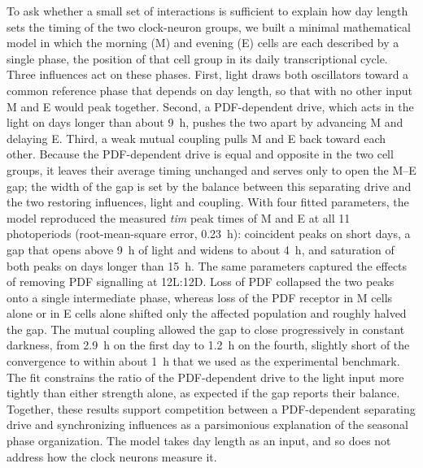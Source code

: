 To ask whether a small set of interactions is sufficient to explain how
day length sets the timing of the two clock-neuron groups, we built a
minimal mathematical model in which the morning (M) and evening (E) cells
are each described by a single phase, the position of that cell group in
its daily transcriptional cycle. Three influences act on these phases.
First, light draws both oscillators toward a common reference phase that
depends on day length, so that with no other input M and E would peak
together. Second, a PDF-dependent drive, which acts in the light on days
longer than about 9~h, pushes the two apart by advancing M and delaying E.
Third, a weak mutual coupling pulls M and E back toward each other.
Because the PDF-dependent drive is equal and opposite in the two cell
groups, it leaves their average timing unchanged and serves only to open
the M--E gap; the width of the gap is set by the balance between this
separating drive and the two restoring influences, light and coupling.
With four fitted parameters, the model reproduced the measured
\textit{tim} peak times of M and E at all 11 photoperiods
(root-mean-square error, 0.23~h): coincident peaks on short days, a gap
that opens above 9~h of light and widens to about 4~h, and saturation of
both peaks on days longer than 15~h. The same parameters captured the
effects of removing PDF signalling at 12L:12D. Loss of PDF collapsed the
two peaks onto a single intermediate phase, whereas loss of the PDF
receptor in M cells alone or in E cells alone shifted only the affected
population and roughly halved the gap. The mutual coupling allowed the gap
to close progressively in constant darkness, from 2.9~h on the first day
to 1.2~h on the fourth, slightly short of the convergence to within about
1~h that we used as the experimental benchmark. The fit constrains the
ratio of the PDF-dependent drive to the light input more tightly than
either strength alone, as expected if the gap reports their balance.
Together, these results support competition between a PDF-dependent
separating drive and synchronizing influences as a parsimonious
explanation of the seasonal phase organization. The model takes day
length as an input, and so does not address how the clock neurons measure
it.
